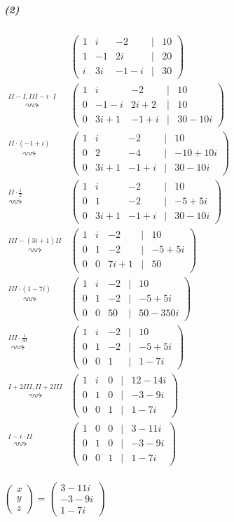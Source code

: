 \documentclass[a4paper,12pt]{article}
\begin{document}
\subparagraph{(2)}
$\begin{aligned}
                                                       & \begin{pmatrix}1&i&-2&|&10\\1&-1&2i&|&20\\i&3i&-1-i&|&30\end{pmatrix}           \\
        \overset{II-I,III-i\cdot I}\rightsquigarrow    & \begin{pmatrix}1&i&-2&|&10\\0&-1-i&2i+2&|&10\\0&3i+1&-1+i&|&30-10i\end{pmatrix} \\
        \overset{II\cdot(-1+i)}\rightsquigarrow        & \begin{pmatrix}1&i&-2&|&10\\0&2&-4&|&-10+10i\\0&3i+1&-1+i&|&30-10i\end{pmatrix} \\
        \overset{II\cdot\frac12}\rightsquigarrow       & \begin{pmatrix}1&i&-2&|&10\\0&1&-2&|&-5+5i\\0&3i+1&-1+i&|&30-10i\end{pmatrix}   \\
        \overset{III-(3i+1)II}\rightsquigarrow         & \begin{pmatrix}1&i&-2&|&10\\0&1&-2&|&-5+5i\\0&0&7i+1&|&50\end{pmatrix}          \\
        \overset{III\cdot(1-7i)}\rightsquigarrow       & \begin{pmatrix}1&i&-2&|&10\\0&1&-2&|&-5+5i\\0&0&50&|&50-350i\end{pmatrix}       \\
        \overset{III\cdot\frac{1}{50}}\rightsquigarrow & \begin{pmatrix}1&i&-2&|&10\\0&1&-2&|&-5+5i\\0&0&1&|&1-7i\end{pmatrix}           \\
        \overset{I+2III,II+2III}\rightsquigarrow       & \begin{pmatrix}1&i&0&|&12-14i\\0&1&0&|&-3-9i\\0&0&1&|&1-7i\end{pmatrix}         \\
        \overset{I-i\cdot II}\rightsquigarrow          & \begin{pmatrix}1&0&0&|&3-11i\\0&1&0&|&-3-9i\\0&0&1&|&1-7i\end{pmatrix}          \\
    \end{aligned}$

$\begin{pmatrix}x\\y\\z\end{pmatrix}=\begin{pmatrix}3-11i\\-3-9i\\1-7i\end{pmatrix}$
\end{document}
